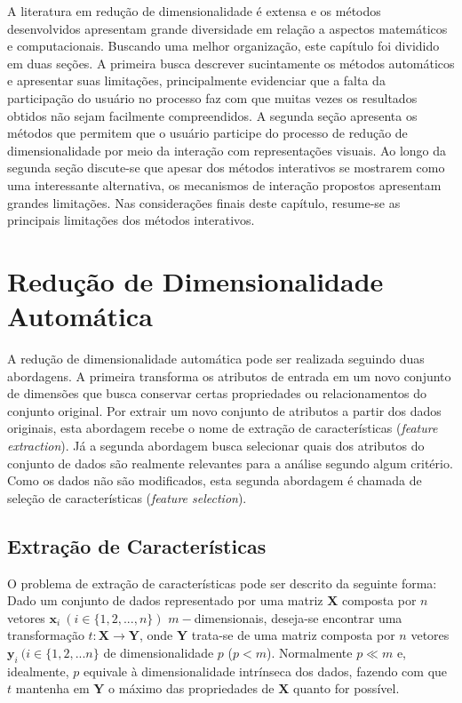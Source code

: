 A literatura em redução de dimensionalidade é extensa e os métodos desenvolvidos apresentam grande diversidade em relação a aspectos matemáticos e computacionais. 
Buscando uma melhor organização, este capítulo foi dividido em duas seções. 
A primeira busca descrever sucintamente os métodos automáticos e apresentar suas limitações, principalmente evidenciar que a falta da participação do usuário no processo faz com que muitas vezes os resultados obtidos não sejam facilmente compreendidos. 
A segunda seção apresenta os métodos que permitem que o usuário participe do processo de redução de dimensionalidade por meio da interação com representações visuais. 
Ao longo da segunda seção discute-se que apesar dos métodos interativos se mostrarem como uma interessante alternativa, os mecanismos de interação propostos apresentam grandes limitações. 
Nas considerações finais deste capítulo, resume-se as principais limitações dos métodos interativos. 

\section{Redução de Dimensionalidade Automática}

A redução de dimensionalidade automática pode ser realizada seguindo duas abordagens. 
A primeira transforma os atributos de entrada em um novo conjunto de dimensões que busca conservar certas propriedades ou relacionamentos do conjunto original. 
Por extrair um novo conjunto de atributos a partir dos dados originais, esta abordagem recebe o nome de extração de características (\emph{feature extraction}).
Já a segunda abordagem busca selecionar quais dos atributos do conjunto de dados são realmente relevantes para a análise segundo algum critério. 
Como os dados não são modificados, esta segunda abordagem é chamada de seleção de características (\emph{feature selection}).

\subsection{Extração de Características}

O problema de extração de características pode ser descrito da seguinte forma: 
Dado um conjunto de dados representado por uma matriz $\textbf{X}$ composta por $n$ vetores $\textbf{x}_i~(i \in \{1,2,...,n\})$ $m-$dimensionais, deseja-se encontrar uma transformação $t: \textbf{X} \rightarrow \textbf{Y}$, onde $\textbf{Y}$ trata-se de uma matriz composta por $n$ vetores $\textbf{y}_i~(i \in \{1,2,...n\}$ de dimensionalidade $p$ ($p < m$). 
Normalmente $p \ll m$ e, idealmente, $p$ equivale à dimensionalidade intrínseca dos dados, fazendo com que $t$ mantenha em $\textbf{Y}$ o máximo das propriedades de $\textbf{X}$ quanto for possível. 

